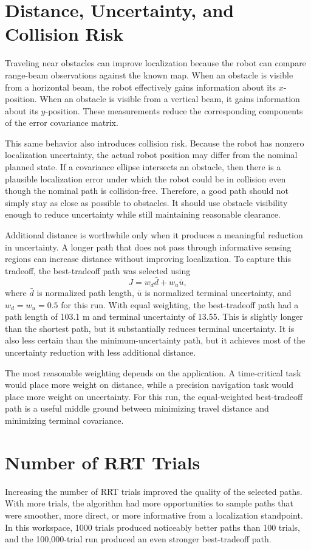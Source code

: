 \documentclass[11pt]{article}
\begin{document}
\section{Distance, Uncertainty, and Collision Risk}
Traveling near obstacles can improve localization because the robot can compare
range-beam observations against the known map. When an obstacle is visible from
a horizontal beam, the robot effectively gains information about its
$x$-position. When an obstacle is visible from a vertical beam, it gains
information about its $y$-position. These measurements reduce the corresponding
components of the error covariance matrix.

This same behavior also introduces collision risk. Because the robot has
nonzero localization uncertainty, the actual robot position may differ from the
nominal planned state. If a covariance ellipse intersects an obstacle, then
there is a plausible localization error under which the robot could be in
collision even though the nominal path is collision-free. Therefore, a good
path should not simply stay as close as possible to obstacles. It should use
obstacle visibility enough to reduce uncertainty while still maintaining
reasonable clearance.

Additional distance is worthwhile only when it produces a meaningful reduction
in uncertainty. A longer path that does not pass through informative sensing
regions can increase distance without improving localization. To capture this
tradeoff, the best-tradeoff path was selected using
\[
    J = w_d \bar{d} + w_u \bar{u},
\]
where $\bar{d}$ is normalized path length, $\bar{u}$ is normalized terminal
uncertainty, and $w_d = w_u = 0.5$ for this run. With equal weighting, the
best-tradeoff path had a path length of 103.1 m and terminal uncertainty of
13.55. This is slightly longer than the shortest path, but it substantially
reduces terminal uncertainty. It is also less certain than the
minimum-uncertainty path, but it achieves most of the uncertainty reduction
with less additional distance.

The most reasonable weighting depends on the application. A time-critical task
would place more weight on distance, while a precision navigation task would
place more weight on uncertainty. For this run, the equal-weighted
best-tradeoff path is a useful middle ground between minimizing travel distance
and minimizing terminal covariance.

\section{Number of RRT Trials}
Increasing the number of RRT trials improved the quality of the selected
paths. With more trials, the algorithm had more opportunities to sample paths
that were smoother, more direct, or more informative from a localization
standpoint. In this workspace, 1000 trials produced noticeably better paths
than 100 trials, and the 100,000-trial run produced an even stronger
best-tradeoff path.
\end{document}
